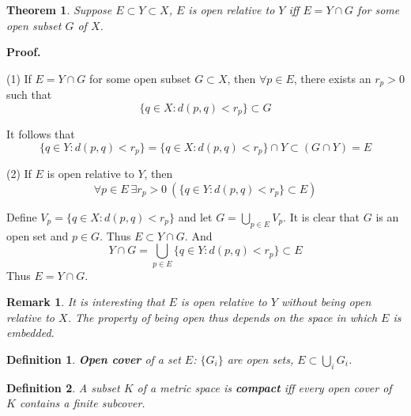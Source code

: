 \documentclass[aps,pra,onecolumn,notitlepage,superscriptaddress]{revtex4-1}
\newtheorem{theo}{Theorem}
\newtheorem{defi}{Definition}
\newtheorem{rem}{Remark}
\def\Proof{{\bf Proof.~}}
\begin{document}
    \begin{theo}
        Suppose $E \subset Y \subset X$, $E$ is open relative to $Y$ iff $E = Y \cap G$ for some open subset $G$ of $X$.
    \end{theo}
    \begin{framed}
    \Proof {

        (1) If $E = Y \cap G$ for some open subset $G \subset X$, then $\forall p \in E$, there exists an $r_p > 0$ such that 
        \begin{equation}
            \{q \in X : d(p, q) < r_p\} \subset G
        \end{equation}
        
        It follows that
        \begin{equation}
            \{q \in Y : d(p, q) < r_p\} = \{q \in X : d(p, q) < r_p\} \cap Y \subset (G \cap Y) = E
        \end{equation}

        (2) If $E$ is open relative to $Y$, then
        \begin{equation}
            \forall p \in E \ \exists r_p > 0 \ \left( \{q \in Y : d(p, q) < r_p\} \subset E \right)
        \end{equation}
        
        Define $V_p = \{ q \in X : d(p, q) < r_p \}$
        and let $G = \bigcup_{p \in E} V_p$.
        It is clear that $G$ is an open set and $p \in G$. Thus $E \subset Y \cap G$. And
        \begin{equation}
            Y \cap G = \bigcup_{p \in E} \{ q \in Y : d(p, q) < r_p \} \subset E
        \end{equation}
        Thus $E = Y \cap G$.
    }
    \end{framed}

    \begin{rem}
        It is interesting that $E$ is open relative to $Y$ without being open relative to $X$. The property of being open thus depends on the space in which $E$ is embedded. 
    \end{rem}

    \begin{defi}
        \textbf{Open cover} of a set $E$: $\{G_i\}$ are open sets, $E \subset \bigcup_i G_i$.
    \end{defi}

    \begin{defi}
        A subset $K$ of a metric space is \textbf{compact} iff every open cover of $K$ contains a finite subcover.
    \end{defi}
\end{document}
